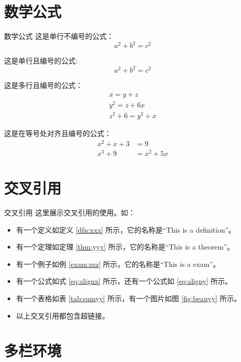 \documentclass[compress,10pt,dvipsnames,notheorems]{beamer} %
\begin{document}
\section{数学公式}%
\begin{frame}{数学公式}
	这是单行不编号的公式：
	\[ a^2 + b^2 = c^2 \]
	
	这是单行且编号的公式:
	\begin{equation}
		a^2 + b^2 = c^2
	\end{equation}

	这是多行且编号的公式：
	\begin{gather}
		x = y + z \\
		y^2 = z + 6x \\
		z^2 + 6 = y^3 + x
	\end{gather}
	
	这是在等号处对齐且编号的公式：
	\begin{align}
		x^2 + x + 3 &= 9 \label{eq:alignx} \\
		x^3 + 9 &= x^2 + 5x \label{eq:aligny}
	\end{align}	
\end{frame}

\section{交叉引用}

\begin{frame}{交叉引用}
	这里展示交叉引用的使用。如：
	\begin{itemize}
		\item 有一个定义如定义 \ref{dfn:xxx} 所示，它的名称是“This is a definition”。
		\item 有一个定理如定理 \ref{thm:yyy} 所示，它的名称是“This is a theorem”。
		\item 有一个例子如例 \ref{exam:zzz} 所示，它的名称是“This is a exam”。
		\item 有一个公式如式 \eqref{eq:alignx} 所示，还有一个公式如 \eqref{eq:aligny} 所示。
		\item 有一个表格如表 \ref{tab:sumyy} 所示，有一个图片如图 \ref{fig:beauyy} 所示。
		\item 以上交叉引用都包含超链接。
	\end{itemize}
\end{frame}

\section{多栏环境}%
\end{document}
